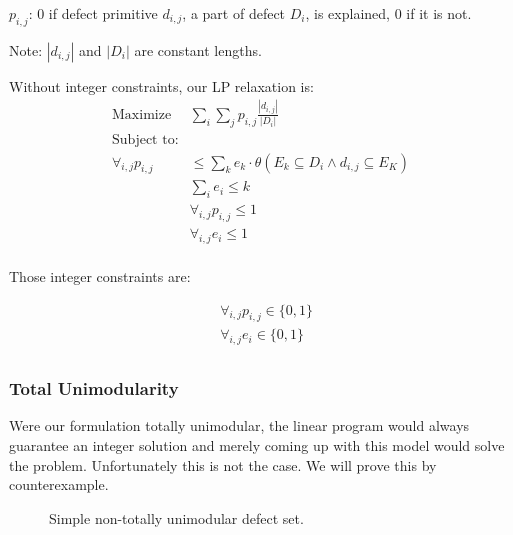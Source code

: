 \documentclass[11pt,twocolumn]{article}
\begin{document}
$p_{i,j}$: 0 if defect primitive $d_{i,j}$, a part of defect $D_i$, is explained, 0 if it is not.

Note: $|d_{i,j}|$ and $|D_i|$ are constant lengths.

Without integer constraints, our LP relaxation is:
\begin{eqnarray*}
  \textrm{Maximize} &\sum_i \sum_j p_{i,j} \frac{|d_{i,j}|}{|D_i|} \\
  \textrm{Subject to:} &\\
  \forall_{i,j} p_{i,j} &\leq \sum_k e_k \cdot \theta(E_k \subseteq D_i \wedge d_{i,j} \subseteq E_K ) \\
  &\sum_i e_i \leq k \\
  &\forall_{i,j} p_{i,j} \leq 1 \\
  &\forall_{i,j} e_i \leq 1 \\
\end{eqnarray*}

Those integer constraints are:

\begin{eqnarray*}
  &\forall_{i,j} p_{i,j} \in \{0,1\} \\
  &\forall_{i,j} e_i  \in \{0,1\} \\
\end{eqnarray*}

\subsubsection{Total Unimodularity}

Were our formulation totally unimodular, the linear program would always guarantee an integer solution and merely coming up with this model would solve the problem.  Unfortunately this is not the case.  We will prove this by counterexample.

\begin{figure}[htb] 
\caption{Simple non-totally unimodular defect set.}
\label{fig:notUni}
\end{figure}
\end{document}
